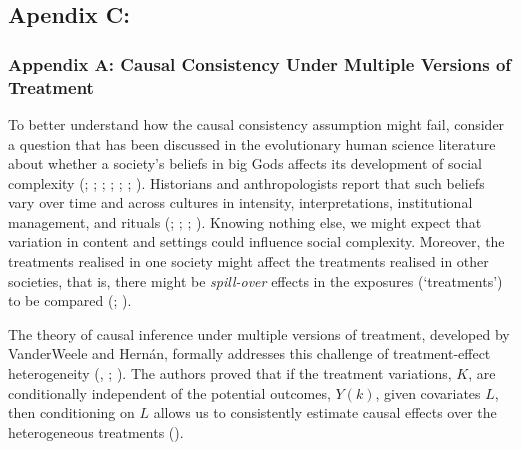 \documentclass[
  single column]{article}
\begin{document}
\subsection{Apendix C:}\label{apendix-c}

\subsubsection{Appendix A: Causal Consistency Under Multiple Versions of
Treatment}\label{appendix-a-causal-consistency-under-multiple-versions-of-treatment}

To better understand how the causal consistency assumption might fail,
consider a question that has been discussed in the evolutionary human
science literature about whether a society's beliefs in big Gods affects
its development of social complexity (; ;
;
;
;
;
).
Historians and anthropologists report that such beliefs vary over time
and across cultures in intensity, interpretations, institutional
management, and rituals (; ;
;
). Knowing nothing else, we
might expect that variation in content and settings could influence
social complexity. Moreover, the treatments realised in one society
might affect the treatments realised in other societies, that is, there
might be \emph{spill-over} effects in the exposures (`treatments') to be
compared (;
).

The theory of causal inference under multiple versions of treatment,
developed by VanderWeele and Hernán, formally addresses this challenge
of treatment-effect heterogeneity
(,
;
). The
authors proved that if the treatment variations, \(K\), are
conditionally independent of the potential outcomes, \(Y(k)\), given
covariates \(L\), then conditioning on \(L\) allows us to consistently
estimate causal effects over the heterogeneous treatments
().
\end{document}
